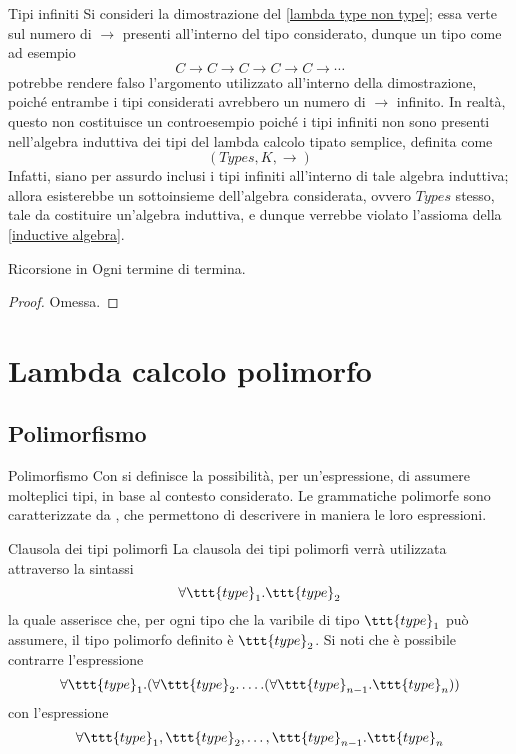\documentclass[a4paper, 12pt]{report}
\begin{document}
    \begin{framedobs}{Tipi infiniti}
        Si consideri la dimostrazione del \cref{lambda type non type}; essa verte sul numero di $\to$ presenti all'interno del tipo considerato, dunque un tipo  come ad esempio $$C \to C \to C \to C \to C \to \cdots$$ potrebbe rendere falso l'argomento utilizzato all'interno della dimostrazione, poiché entrambe i tipi considerati avrebbero un numero di $\to$ infinito. In realtà, questo non costituisce un controesempio poiché i tipi infiniti non sono presenti nell'algebra induttiva dei tipi del lambda calcolo tipato semplice, definita come $$(Types, K, \to)$$ Infatti, siano per assurdo inclusi i tipi infiniti all'interno di tale algebra induttiva; allora esisterebbe un sottoinsieme dell'algebra considerata, ovvero $Types$ stesso, tale da costituire un'algebra induttiva, e dunque verrebbe violato l'assioma  della \cref{inductive algebra}.
    \end{framedobs}

    \begin{framedprop}{Ricorsione in }
        Ogni termine di  termina.
    \end{framedprop}

    \begin{proof}
        Omessa.
    \end{proof}

    \section{Lambda calcolo polimorfo}
    
    \subsection{Polimorfismo}

    \begin{frameddefn}{Polimorfismo}
        Con  si definisce la possibilità, per un'espressione, di assumere molteplici tipi, in base al contesto considerato. Le grammatiche polimorfe sono caratterizzate da , che permettono di descrivere in maniera  le loro espressioni.
    \end{frameddefn}

    \begin{frameddefn}{Clausola dei tipi polimorfi}
        La clausola dei tipi polimorfi verrà utilizzata attraverso la sintassi $$\forall \ttt{type}_1.\ttt{type}_2$$ la quale asserisce che, per ogni tipo che la varibile di tipo $\ttt{type}_1$ può assumere, il tipo polimorfo definito è $\ttt{type}_2$. Si noti che è possibile contrarre l'espressione $$\forall \ttt{type}_1.(\forall \ttt{type}_2 . \ldots .(\forall \ttt{type}_{n - 1}. \ttt{type}_n))$$ con l'espressione $$\forall \ttt{type}_1, \ttt{type}_2, \ldots, \ttt{type}_{n - 1}. \ttt{type}_n$$
    \end{frameddefn}
\end{document}
